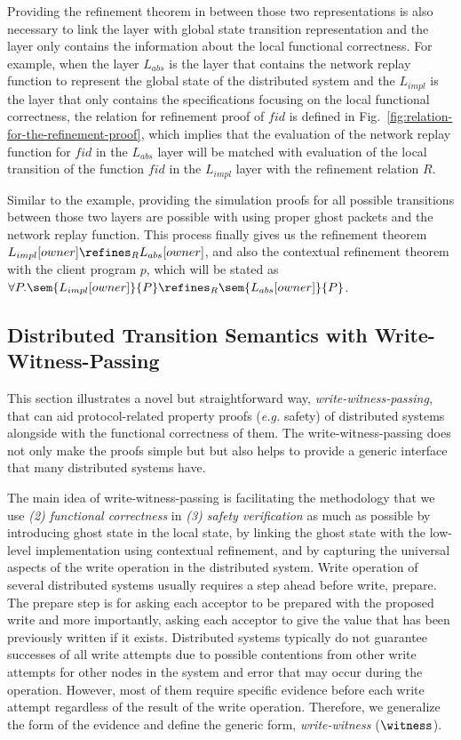 Providing the refinement theorem in between those two representations is also necessary to link the layer with global state transition representation and the layer only contains the information about the local functional correctness.
For example, when the layer $L_{abs}$ is the layer that contains the network replay function to represent the global state of the distributed system and the $L_{impl}$ is the layer that only contains the specifications focusing on the local functional correctness, 
the relation for refinement proof of $fid$ is defined in Fig.~\ref{fig:relation-for-the-refinement-proof}, 
which implies that the evaluation of the network replay function  for $fid$ in the $L_{abs}$  layer 
will be matched with evaluation of the local transition of the function $fid$ in the $L_{impl}$ layer 
with the refinement relation $R$.

Similar to the example, providing the simulation proofs for all possible transitions between 
those two layers are possible with using proper ghost packets and the network replay function.
This process finally gives us the refinement theorem 
$L_{impl}[owner]  \refines_R L_{abs}[owner]$, and also the contextual refinement theorem 
with the client program $p$, which will be stated as $\forall{}P.\sem{L_{impl}[owner]}{P} \refines_R \sem{L_{abs}[owner]}{P}$.

\subsection{Distributed Transition Semantics with Write-Witness-Passing}
\label{subsec:distributed-transition-semantics-with-witness-passing}

This section illustrates a novel but straightforward way, \textit{write-witness-passing}, that can aid protocol-related property proofs (\textit{e.g.} safety) of distributed systems alongside with the functional correctness of them. 
The write-witness-passing does not only make the proofs simple but 
but also helps to provide a generic interface that many distributed systems have.


The main idea of write-witness-passing is facilitating the methodology that we use \textit{(2) functional correctness} in
\textit{(3) safety verification} as much as possible by
introducing ghost state in the local state, by linking the ghost state with the low-level
implementation using contextual refinement, and by capturing the universal aspects of the write operation in the distributed system.
Write operation of several distributed systems usually requires a step ahead before write, prepare. 
The prepare step is for 
asking each acceptor to be prepared with the proposed write
and more importantly, asking each acceptor to give the value that has been previously written if it exists.
Distributed systems typically do not guarantee successes of all write attempts due to possible contentions from other write attempts for 
other nodes in the system
and error that may occur during the operation. 
However, most of them require specific evidence before each write attempt regardless of the result of the write operation. 
Therefore, we generalize the form of the evidence and define the generic form, \textit{write-witness} ($\witness$).

